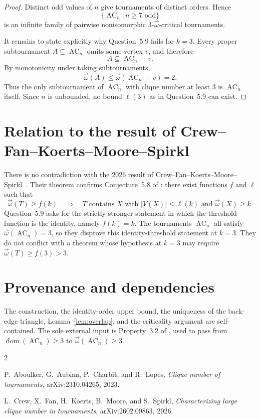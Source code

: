 \documentclass[11pt]{article}
\newcommand{\tomega}{\vec{\omega}}
\newcommand{\domn}{\operatorname{dom}}
\newcommand{\AC}{\operatorname{AC}}
\begin{document}
\begin{proof}
Distinct odd values of \(n\) give tournaments of distinct orders.
Hence
\[
  \{\AC_n:n\geq7\text{ odd}\}
\]
is an infinite family of pairwise nonisomorphic
\(3\)-\(\tomega\)-critical tournaments.

It remains to state explicitly why Question~5.9 fails for \(k=3\).
Every proper subtournament \(A\subsetneq\AC_n\) omits some vertex
\(v\), and therefore
\[
  A\subseteq\AC_n-v.
\]
By monotonicity under taking subtournaments,
\[
  \tomega(A)
  \leq
  \tomega(\AC_n-v)
  =
  2.
\]
Thus the only subtournament of \(\AC_n\) with clique number at least
\(3\) is \(\AC_n\) itself. Since \(n\) is unbounded, no bound
\(\ell(3)\) as in Question~5.9 can exist.
\end{proof}

\section*{Relation to the result of Crew--Fan--Koerts--Moore--Spirkl}

There is no contradiction with the 2026 result of
Crew--Fan--Koerts--Moore--Spirkl~\cite{CFKMS}. Their theorem confirms
Conjecture~5.8 of \cite{AACL}: there exist functions \(f\) and
\(\ell\) such that
\[
  \tomega(T)\geq f(k)
  \quad\Longrightarrow\quad
  \text{\(T\) contains \(X\) with
  \(|V(X)|\leq\ell(k)\) and \(\tomega(X)\geq k\)}.
\]
Question~5.9 asks for the strictly stronger statement in which the
threshold function is the identity, namely \(f(k)=k\). The
tournaments \(\AC_n\) all satisfy \(\tomega(\AC_n)=3\), so they
disprove this identity-threshold statement at \(k=3\). They do not
conflict with a theorem whose hypothesis at \(k=3\) may require
\(\tomega(T)\geq f(3)>3\).

\section*{Provenance and dependencies}

The construction, the identity-order upper bound, the uniqueness of
the back-edge triangle, Lemma~\ref{lem:overlap}, and the criticality
argument are self-contained. The sole external input is
Property~3.2 of \cite{AACL}, used to pass from
\(\domn(\AC_n)\geq3\) to \(\tomega(\AC_n)\geq3\).

\begin{thebibliography}{2}

P.~Aboulker, G.~Aubian, P.~Charbit, and R.~Lopes,
\newblock \emph{Clique number of tournaments},
\newblock arXiv:2310.04265, 2023.

L.~Crew, X.~Fan, H.~Koerts, B.~Moore, and S.~Spirkl,
\newblock \emph{Characterizing large clique number in tournaments},
\newblock arXiv:2602.09863, 2026.

\end{thebibliography}
\end{document}
